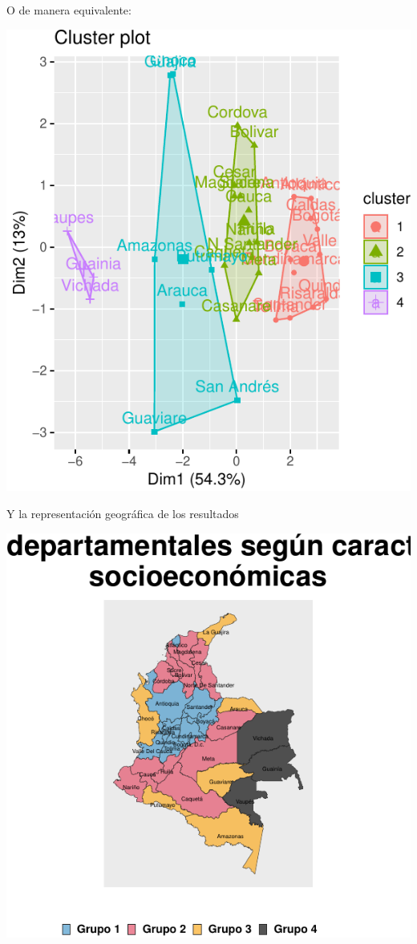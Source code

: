 O de manera equivalente:

\includegraphics{Anexo_Cluster_files/figure-latex/unnamed-chunk-6-1.pdf}

Y la representación geográfica de los resultados

\includegraphics{Anexo_Cluster_files/figure-latex/unnamed-chunk-7-1.pdf}

